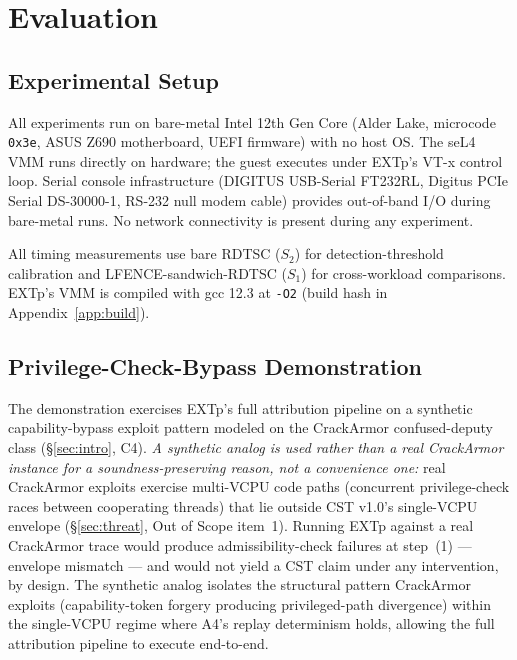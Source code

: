 \documentclass[conference]{IEEEtran}
\begin{document}
\section{Evaluation}\label{sec:eval}

\subsection{Experimental Setup}

All experiments run on bare-metal Intel 12th Gen Core (Alder Lake,
microcode \texttt{0x3e}, ASUS Z690 motherboard, UEFI firmware) with
no host OS. The seL4 VMM runs directly on hardware; the guest
executes under EXTp's VT-x control loop. Serial console infrastructure
(DIGITUS USB-Serial FT232RL, Digitus PCIe Serial DS-30000-1, RS-232
null modem cable) provides out-of-band I/O during bare-metal runs.
No network connectivity is present during any experiment.

All timing measurements use bare RDTSC ($S_2$) for
detection-threshold calibration and LFENCE-sandwich-RDTSC ($S_1$)
for cross-workload comparisons. EXTp's VMM is compiled with gcc 12.3
at \texttt{-O2} (build hash in Appendix~\ref{app:build}).

\subsection{Privilege-Check-Bypass Demonstration}\label{sec:eval-demo}

The demonstration exercises EXTp's full attribution pipeline on a
synthetic capability-bypass exploit pattern modeled on the
CrackArmor confused-deputy class (\S\ref{sec:intro}, C4).
\emph{A synthetic analog is used rather than a real CrackArmor
instance for a soundness-preserving reason, not a convenience one:}
real CrackArmor exploits exercise multi-VCPU code paths (concurrent
privilege-check races between cooperating threads) that lie outside
CST v1.0's single-VCPU envelope (\S\ref{sec:threat}, Out of Scope
item~1). Running EXTp against a real CrackArmor trace would produce
admissibility-check failures at step~(1) --- envelope mismatch ---
and would not yield a CST claim under any intervention, by design.
The synthetic analog isolates the structural pattern CrackArmor
exploits (capability-token forgery producing privileged-path
divergence) within the single-VCPU regime where A4's replay
determinism holds, allowing the full attribution pipeline to
execute end-to-end.
\end{document}
